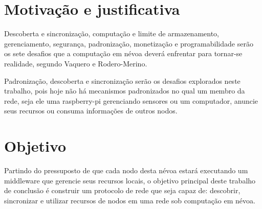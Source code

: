 \section{Motivação e justificativa}

Descoberta e sincronização, computação e limite de armazenamento, gerenciamento, segurança, padronização, monetização e programabilidade serão os sete desafios que a computação em névoa deverá enfrentar para tornar-se realidade, segundo Vaquero e Rodero-Merino\cite{Vaquero:2014}.

Padronização, descoberta e sincronização serão os desafios explorados neste trabalho, pois hoje não há mecanismos padronizados no qual um membro da rede, seja ele uma raspberry-pi gerenciando sensores ou um computador, anuncie seus recursos ou consuma informações de outros nodos.

\section{Objetivo}

Partindo do pressuposto de que cada nodo desta névoa estará executando um middleware que gerencie seus recursos locais, o objetivo principal deste trabalho de conclusão é construir um protocolo de rede que seja capaz de: descobrir, sincronizar e utilizar recursos de nodos em uma rede sob computação em névoa.       




 
 
 
 
 
 
 
 









